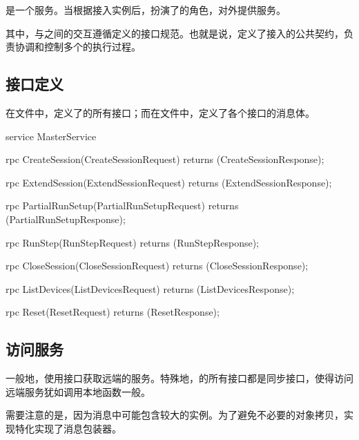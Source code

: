 \begin{content}

是一个服务。当根据接入实例后，扮演了的角色，对外提供服务。

其中，与之间的交互遵循定义的接口规范。也就是说，定义了接入的公共契约，负责协调和控制多个的执行过程。

\subsection{接口定义}

在文件中，定义了的所有接口；而在文件中，定义了各个接口的消息体。

\begin{leftbar}
\begin{c++}
service MasterService {
  rpc CreateSession(CreateSessionRequest) 
      returns (CreateSessionResponse);
  
  rpc ExtendSession(ExtendSessionRequest) 
      returns (ExtendSessionResponse);

  rpc PartialRunSetup(PartialRunSetupRequest) 
      returns (PartialRunSetupResponse);

  rpc RunStep(RunStepRequest) 
      returns (RunStepResponse);
  
  rpc CloseSession(CloseSessionRequest) 
      returns (CloseSessionResponse);
  
  rpc ListDevices(ListDevicesRequest) 
      returns (ListDevicesResponse);

  rpc Reset(ResetRequest) 
      returns (ResetResponse);
}
\end{c++}
\end{leftbar}

\subsection{访问服务}

一般地，使用接口获取远端的服务。特殊地，的所有接口都是同步接口，使得访问远端服务犹如调用本地函数一般。

需要注意的是，因为消息中可能包含较大的实例。为了避免不必要的对象拷贝，实现特化实现了消息包装器。


\end{content}
